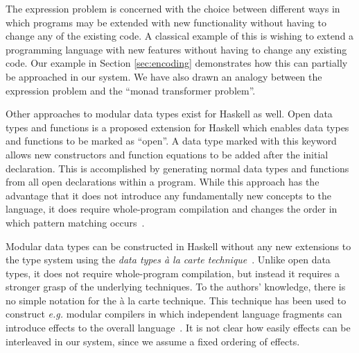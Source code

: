 The expression problem is concerned with the choice between different ways in which programs may be extended with new functionality without having to change any of the existing code. A classical example of this is wishing to extend a programming language with new features without having to change any existing code. Our example in Section \ref{sec:encoding} demonstrates how this can partially be approached in our system. We have also drawn an analogy between the expression problem and the ``monad transformer problem''. 

Other approaches to modular data types exist for Haskell as well. Open data types and functions is a proposed extension for Haskell which enables data types and functions to be marked as ``open''. A data type marked with this keyword allows new constructors and function equations to be added after the initial declaration. This is accomplished by generating normal data types and functions from all open declarations within a program. While this approach has the advantage that it does not introduce any fundamentally new concepts to the language, it does require whole-program compilation and changes the order in which pattern matching occurs~\cite{loh2006open}.

Modular data types can be constructed in Haskell without any new extensions to the type system using the \emph{data types \`a la carte technique}~\cite{swierstra2008data}. Unlike open data types, it does not require whole-program compilation, but instead it requires a stronger grasp of the underlying techniques. To the authors' knowledge, there is no simple notation for the \`a la carte technique. This technique has been used to construct \emph{e.g.} modular compilers in which independent language fragments can introduce effects to the overall language~\cite{day2012towards}. It is not clear how easily effects can be interleaved in our system, since we assume a fixed ordering of effects.


